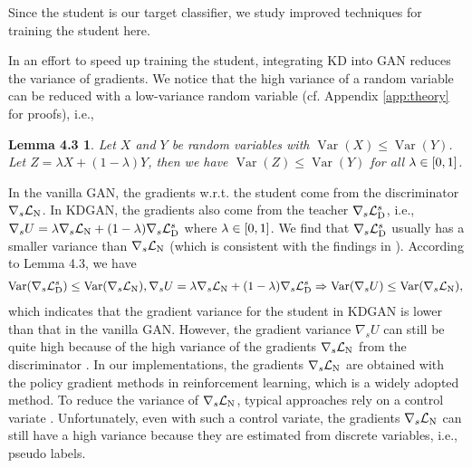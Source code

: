\documentclass{article}
\newtheorem*{lemma1}{Lemma 4.3}
\newcommand{\numberlem}{4.3}
\newcommand{\LOSS}[2]{\mathcal{#1}_{\rm{#2}}} %
\DeclareMathOperator{\VAR}{Var}
\newcommand{\kdganabbrobj}{U}
\newcommand{\negloss}{\LOSS{L}{N}}
\newcommand{\stddistloss}{\LOSS{L}{D}^{s}}
\newcommand{\stdgrad}{\nabla_{s}}
\newcommand{\stddisgrad}{\stdgrad\negloss}
\newcommand{\stdtchgrad}{\stdgrad\stddistloss}
\begin{document}
Since the student is our target classifier, we study improved techniques for training the student here.

In an effort to speed up training the student, integrating KD into GAN reduces the variance of gradients. %
We notice that the high variance of a random variable can be reduced with a low-variance random variable (cf. Appendix \ref{app:theory} for proofs), i.e.,
\begin{lemma1}
Let $X$ and $Y$ be random variables with $\VAR(X)\leq\VAR(Y)$.
Let $Z = \lambda X+ (1-\lambda) Y$, then we have $\VAR(Z)\leq\VAR(Y)$ for all $\lambda\in\interval{0}{1}$.
\end{lemma1}
In the vanilla GAN, the gradients w.r.t. the student come from the discriminator $\stddisgrad$.
In KDGAN, the gradients also come from the teacher $\stdtchgrad$, i.e., $\stdgrad\kdganabbrobj=\lambda\stddisgrad+(1-\lambda)\stdtchgrad$ where $\lambda\in\interval{0}{1}$.
We find that $\stdtchgrad$ usually has a smaller variance than $\stddisgrad$ (which is consistent with the findings in \cite{hinton2015distilling,sau2016deep}).
According to Lemma \numberlem, we have
\begin{equation}
\begin{aligned}
\hspace*{-0.04cm}
\VAR(\stdtchgrad)\leq\VAR(\stddisgrad)
\text{,}
\,
\stdgrad\kdganabbrobj=\lambda\stddisgrad+(1-\lambda)\stdtchgrad
\Rightarrow
\VAR(\stdgrad\kdganabbrobj)\leq\VAR(\stddisgrad)
\text{,}
\end{aligned}
\end{equation}%
which indicates that the gradient variance for the student in KDGAN is lower than that in the vanilla GAN.
However, the gradient variance $\stdgrad\kdganabbrobj$ can still be quite high because of the high variance of the gradients $\stddisgrad$ from the discriminator \cite{chongxuan2017triple,yu2017seqgan}.
In our implementations, the gradients $\stddisgrad$ are obtained with the policy gradient methods \cite{wang2017irgan,yu2017seqgan} in reinforcement learning, which is a widely adopted method.
To reduce the variance of $\stddisgrad$, typical approaches rely on a control variate \cite{mnih2016variational,wang2017irgan}.
Unfortunately, even with such a control variate, the gradients $\stddisgrad$ can still have a high variance because they are estimated from discrete variables, i.e., pseudo labels.
\end{document}
